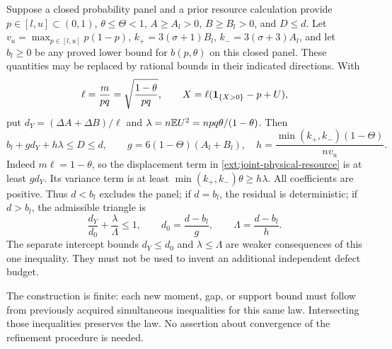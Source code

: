 Suppose a closed probability panel and a prior resource calculation
provide $p\in[l,u]\subset(0,1)$, $\theta\le\Theta<1$,
$A\ge A_l>0$, $B\ge B_l>0$, and $D\le d$.
Let $v_u=\max_{p\in[l,u]}p(1-p)$,
$k_+=3(\sigma+1)B_l$, $k_-=3(\sigma+3)A_l$, and let
$b_l\ge0$ be any proved lower bound for $b(p,\theta)$ on this
closed panel. These quantities may be replaced by rational bounds in
their indicated directions. With
\[
 \ell=\frac m{pq}=\sqrt{\frac{1-\theta}{pq}},\qquad
 X=\ell(\mathbf 1_{\{X>0\}}-p+U),
\]
put $d_Y=(\Delta A+\Delta B)/\ell$ and
$\lambda=n\mathbb E U^2=npq\theta/(1-\theta)$. Then
\begin{equation}\label{ext:count-triangle-derived}
 b_l+g d_Y+h\lambda\le D\le d,\qquad
 g=6(1-\Theta)(A_l+B_l),\quad
 h=\frac{\min(k_+,k_-)(1-\Theta)}{n v_u}.
\end{equation}
Indeed $m\ell=1-\theta$, so the displacement term in
\eqref{ext:joint-physical-resource} is at least $g d_Y$.
Its variance term is at least $\min(k_+,k_-)\theta\ge h\lambda$.
All coefficients are positive. Thus $d<b_l$ excludes the panel; if
$d=b_l$, the residual is deterministic; if $d>b_l$, the admissible
triangle is
\[
 \frac{d_Y}{d_0}+\frac\lambda\Lambda\le1,\qquad
 d_0=\frac{d-b_l}{g},\qquad\Lambda=\frac{d-b_l}{h}.
\]
The separate intercept bounds $d_Y\le d_0$ and
$\lambda\le\Lambda$ are weaker consequences of this one inequality.
They must not be used to invent an additional independent defect budget.

The construction is finite: each new moment, gap, or support bound must
follow from previously acquired simultaneous inequalities for this same
law. Intersecting those inequalities preserves the law. No assertion
about convergence of the refinement procedure is needed.
